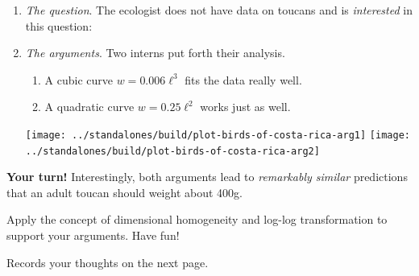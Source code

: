 \documentclass[../main.tex]{subfiles}
\begin{document}
\begin{example}
\begin{enumerate}[wide, label=(\arabic*)]
    \item \emph{The question}. The ecologist does not have data on toucans and is \emph{interested} in this question:
      \begin{center}
      \end{center}

    \item \emph{The arguments}. Two interns put forth their analysis. 
      \begin{enumerate}[wide, label=Intern \Alph*:]
        \item A cubic curve \(w = 0.006 \ell^{3}\) fits the data really well.
        \item A quadratic curve \(w = 0.25 \ell^{2}\) works just as well.
      \end{enumerate}

      \texttt{[image: ../standalones/build/plot-birds-of-costa-rica-arg1]}
      \texttt{[image: ../standalones/build/plot-birds-of-costa-rica-arg2]}
  \end{enumerate}

  \medskip
  \begin{mdframed}[roundcorner=10pt]
    \textbf{Your turn!} Interestingly, both arguments lead to \emph{remarkably similar} predictions that an adult toucan should weight about 400g. 
    \begin{center}
    \end{center}

    Apply the concept of dimensional homogeneity and log-log transformation to support your arguments. Have fun!
  \end{mdframed}

  Records your thoughts on the next page. 

\end{example}
\end{document}
